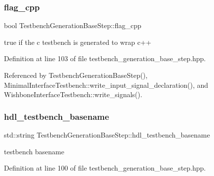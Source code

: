 \mbox{\label{classTestbenchGenerationBaseStep_a4644a66d06768013141bb2d4b6830b59}} 
\subsubsection{\texorpdfstring{flag\+\_\+cpp}{flag\_cpp}}
{\footnotesize\ttfamily bool Testbench\+Generation\+Base\+Step\+::flag\+\_\+cpp\hspace{0.3cm}{\ttfamily [protected]}}



true if the c testbench is generated to wrap c++ 



Definition at line 103 of file testbench\+\_\+generation\+\_\+base\+\_\+step.\+hpp.



Referenced by Testbench\+Generation\+Base\+Step(), Minimal\+Interface\+Testbench\+::write\+\_\+input\+\_\+signal\+\_\+declaration(), and Wishbone\+Interface\+Testbench\+::write\+\_\+signals().

\mbox{\label{classTestbenchGenerationBaseStep_ae28d8f98adb06069807a29b7340b508c}} 
\subsubsection{\texorpdfstring{hdl\+\_\+testbench\+\_\+basename}{hdl\_testbench\_basename}}
{\footnotesize\ttfamily std\+::string Testbench\+Generation\+Base\+Step\+::hdl\+\_\+testbench\+\_\+basename\hspace{0.3cm}{\ttfamily [protected]}}



testbench basename 



Definition at line 100 of file testbench\+\_\+generation\+\_\+base\+\_\+step.\+hpp.



